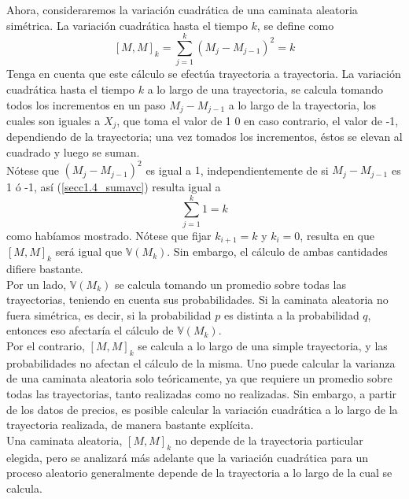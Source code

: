 \documentclass[11pt,notitlepage]{article}
\begin{document}
Ahora, consideraremos la variación cuadrática de una caminata aleatoria simétrica. La variación cuadrática hasta el tiempo $k$, se define como
\begin{equation}\label{secc1.4_sumavc}
    [M,M]_{k}=\sum_{j=1}^{k}(M_{j}-M_{j-1})^{2}=k
\end{equation}
Tenga en cuenta que este cálculo se efectúa trayectoria a trayectoria. La variación cuadrática hasta el tiempo \(k\) a lo largo de una trayectoria, se calcula tomando todos los incrementos en un paso $M_{j}-M_{j-1}$ a lo largo de la trayectoria, los cuales son iguales a $X_{j}$, que toma el valor de 1 0 en caso contrario, el valor de -1, dependiendo de la trayectoria; una vez tomados los incrementos, éstos se elevan al cuadrado y luego se suman.\\

Nótese que $(M_{j}-M_{j-1})^2$ es igual a $1$, independientemente de si $M_{j}-M_{j-1}$ es 1 ó -1, así (\ref{secc1.4_sumavc}) resulta igual a
\begin{equation}
    \sum_{j=1}^{k}1=k
\end{equation}
 como habíamos mostrado. Nótese que fijar $k_{i+1}=k$ y $k_{i}=0$, resulta en que $[M,M]_{k}$ será igual que $\mathbb{V}(M_{k})$. Sin embargo, el cálculo de ambas cantidades difiere bastante.\\


Por un lado, $\mathbb{V}(M_{k})$ se calcula tomando un promedio sobre todas las trayectorias, teniendo en cuenta sus probabilidades. Si la caminata aleatoria no fuera simétrica, es decir, si la probabilidad $p$ es distinta a la probabilidad $q$, entonces eso afectaría el cálculo de $\mathbb{V}(M_{k})$.\\

Por el contrario, $[M,M]_{k}$ se calcula a lo largo de una simple trayectoria, y las probabilidades no afectan el cálculo de la misma. Uno puede calcular la varianza de una caminata aleatoria solo teóricamente, ya que requiere un promedio sobre todas las trayectorias, tanto realizadas como no realizadas. Sin embargo, a partir de los datos de precios, es posible calcular la variación cuadrática a lo largo de la trayectoria realizada, de manera bastante explícita.\\

Una caminata aleatoria, $[M,M]_{k}$ no depende de la trayectoria particular elegida, pero se analizará más adelante que la variación cuadrática para un proceso aleatorio generalmente depende de la trayectoria a lo largo de la cual se calcula.
\end{document}
